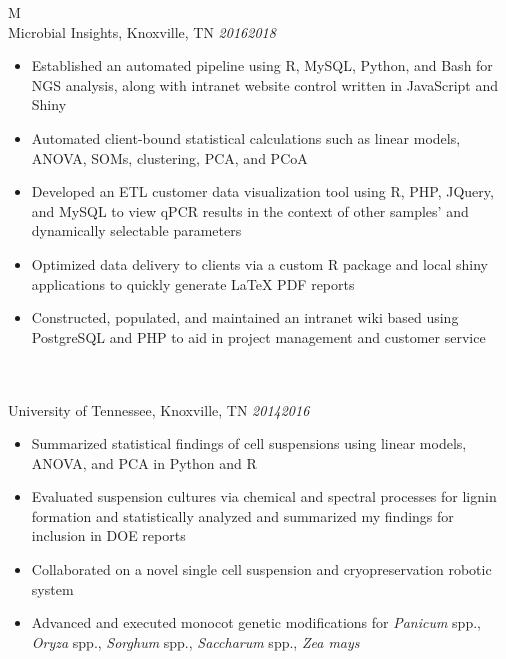 \documentclass[10pt]{article}%
\begin{document}
    \begin{tabularx}{\linewidth}{M}%
         \\
        Microbial Insights, Knoxville, TN \textit{2016\textemdash{}2018} \\
        \begin{itemize}[topsep=-12pt,parsep=0em]
            \setlength\itemsep{0em}
            \item Established an automated pipeline using R, MySQL, Python, and Bash for NGS analysis, along with intranet website control written in JavaScript and Shiny  %
            \item Automated client-bound statistical calculations such as linear models, ANOVA, SOMs, clustering, PCA, and PCoA %
            \item Developed an ETL customer data visualization tool using R, PHP, JQuery, and MySQL to view qPCR results in the context of other samples' and dynamically selectable parameters %
            \item Optimized data delivery to clients via a custom R package and local shiny applications to quickly generate \LaTeX{} PDF reports  %
            \item Constructed, populated, and maintained an intranet wiki based using PostgreSQL and PHP to aid in project management and customer service
        \end{itemize} \\
         \\
        University of Tennessee, Knoxville, TN \textit{2014\textemdash{}2016} \\
        \begin{itemize}[topsep=-12pt,parsep=0em]
            \setlength\itemsep{0em}
            \item Summarized statistical findings of cell suspensions using linear models, ANOVA, and PCA in Python and R %
            \item Evaluated suspension cultures via chemical and spectral processes for lignin formation and statistically analyzed and summarized my findings for inclusion in DOE reports %
            \item Collaborated on a novel single cell suspension and cryopreservation robotic system %
            \item Advanced and executed monocot genetic modifications for \textit{Panicum} spp., \textit{Oryza} spp., \textit{Sorghum} spp., \textit{Saccharum} spp., \textit{Zea mays}

\end{itemize}
\end{tabularx}
\end{document}
